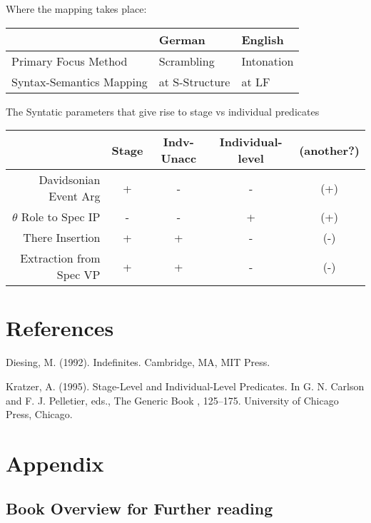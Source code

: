 \documentclass[landscape]{article}
\begin{document}
\begin{example}Where the mapping takes place:\\
\begin{tabular}{|l||l|l|}\hline
& German & English\\\hline\hline
Primary Focus Method& Scrambling  & Intonation\\
Syntax-Semantics Mapping & at S-Structure& at LF \\\hline
\end{tabular}
\end{example}

\begin{example}The Syntatic parameters that give rise to stage vs individual predicates
\begin{tabular}{|r||c|c|c|c|}\hline
& Stage & Indv-Unacc & Individual-level& (another?)\\\hline\hline
Davidsonian Event Arg & + & - & - & (+)\\\hline
$\theta$ Role to Spec IP & - & - & + & (+)\\
There Insertion & + & + & - & (-)\\ 
Extraction from Spec VP & + & + & -& (-)\\\hline
\end{tabular}
\end{example}


\section*{References}
\begin{reflist}

Diesing, M. (1992). Indefinites. Cambridge, MA, MIT Press.

Kratzer, A. (1995). Stage-Level and Individual-Level Predicates. In G. N. Carlson and F. J. Pelletier, eds., The Generic Book , 125--175. University of Chicago Press, Chicago.

\end{reflist}

\section{Appendix}

\subsection{Book Overview for Further reading}
\end{document}
